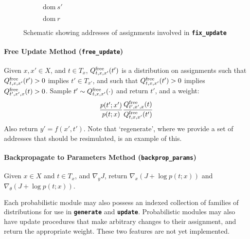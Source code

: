 \documentclass{article}
\newcommand{\code}[1]{\texttt{\small{\textbf{#1}}}}
\newcommand{\dom}[1]{\mbox{dom}{~#1}}
\newcommand{\free}[0]{\mbox{\scriptsize free}}
\newcommand{\innerll}[0]{(0.25 + 0.625, 0.625)}
\newcommand{\innerlr}[0]{(0.25 + 0.625 + 0.5, 0.625)}
\newcommand{\innerur}[0]{(0.25 + 0.625 + 0.5, 0.625 + 0.5)}
\newcommand{\innerul}[0]{(0.25 + 0.625, 0.625 + 0.5)}
\newcommand{\outerll}[0]{(0.25, 0)}
\newcommand{\outerlr}[0]{(0.25 + 1.75, 0)}
\newcommand{\outerur}[0]{(0.25 + 1.75, 1.75)}
\newcommand{\outerul}[0]{(0.25, 1.75)}
\newcommand{\all}[0]{(0, 0)}
\newcommand{\aur}[0]{(2, 2)}
\newcommand{\bll}[0]{(0.25, -0.25)}
\newcommand{\bur}[0]{(2.25, 1.75)}
\begin{document}
\begin{figure}[t]
\begin{subfigure}[b]{0.3\textwidth}
\caption{$\dom{s'}$}
\end{subfigure}%
\begin{subfigure}[b]{0.3\textwidth}
\centering
{}
\caption{$\dom{r}$}
\end{subfigure}
\caption{Schematic showing addresses of assignments involved in \code{fix\_update}}
\end{figure}



\paragraph{Free Update Method (\code{free\_update})}
Given $x, x' \in X$, and $t \in T_x$, $Q^{\free}_{t,x,x'}(t')$ is a distribution on assignments such that $Q^{\free}_{t,x,x'}(t') > 0$ implies $t' \in T_{x'}$, and such that $Q^{\free}_{t,x,x'}(t') > 0$ implies $Q^{\free}_{t',x',x}(t) > 0$.
Sample $t' \sim Q^{\free}_{t,x,x'}(\cdot)$ and return $t'$, and a weight:
\[
    \frac{p(t'; x')}{p(t; x)} \frac{Q^{\free}_{t',x',x}(t)}{Q^{\free}_{t,x,x'}(t')}
\]
Also return $y' = f(x', t')$.
Note that `regenerate', where we provide a set of addresses that should be resimulated, is an example of this.

\paragraph{Backpropagate to Parameters Method (\code{backprop\_params})}
Given $x \in X$ and $t \in T_x$, and $\nabla_y J$, return $\nabla_x (J + \log p(t; x))$ and $\nabla_{\theta} (J + \log p(t; x))$.


Each probabilistic module may also possess an indexed collection of families of distributions for use in \code{generate} and \code{update}.
Probabilistic modules may also have update procedures that make arbitrary changes to their assignment, and return the appropriate weight.
These two features are not yet implemented.
\end{document}
